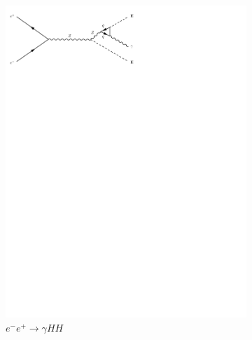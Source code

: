 \begin{figure}[h]
\begin{subfigure}[b]{0.3\textwidth}
    \includegraphics[trim={0.5cm 22cm 10cm 0cm},width=\textwidth]{../Diagrams/D9.pdf}
    \caption{$e^-e^+ \rightarrow \gamma HH$}
    \label{fey:9}
  \end{subfigure}
  \newline
  \newline
  \begin{subfigure}[b]{0.3\textwidth}

\end{subfigure}
\end{figure}

